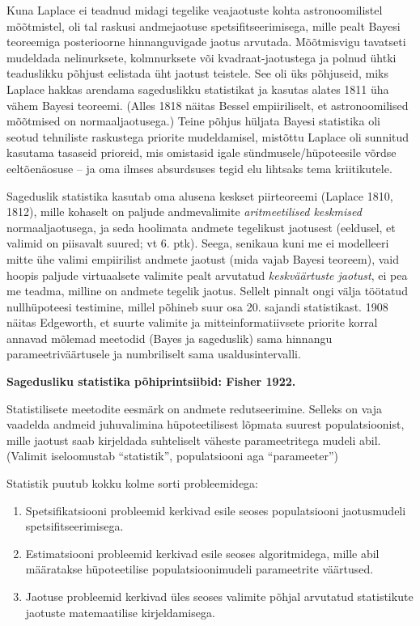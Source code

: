 \documentclass[]{book}
\begin{document}
Kuna Laplace ei teadnud midagi tegelike veajaotuste kohta astronoomilistel mõõtmistel, oli tal raskusi andmejaotuse spetsifitseerimisega, mille pealt Bayesi teoreemiga posterioorne hinnanguvigade jaotus arvutada. Mõõtmisvigu tavatseti mudeldada nelinurksete, kolmnurksete või kvadraat-jaotustega ja polnud ühtki teaduslikku põhjust eelistada üht jaotust teistele. See oli üks põhjuseid, miks Laplace hakkas arendama sageduslikku statistikat ja kasutas alates 1811 üha vähem Bayesi teoreemi. (Alles 1818 näitas Bessel empiiriliselt, et astronoomilised mõõtmised on normaaljaotusega.) Teine põhjus hüljata Bayesi statistika oli seotud tehniliste raskustega priorite mudeldamisel, mistõttu Laplace oli sunnitud kasutama tasaseid prioreid, mis omistasid igale sündmusele/hüpoteesile võrdse eeltõenäosuse -- ja oma ilmses absurdsuses tegid elu lihtsaks tema kriitikutele.

Sageduslik statistika kasutab oma alusena keskset piirteoreemi (Laplace 1810, 1812), mille kohaselt on paljude andmevalimite \emph{aritmeetilised keskmised} normaaljaotusega, ja seda hoolimata andmete tegelikust jaotusest (eeldusel, et valimid on piisavalt suured; vt 6. ptk). Seega, senikaua kuni me ei modelleeri mitte ühe valimi empiirilist andmete jaotust (mida vajab Bayesi teoreem), vaid hoopis paljude virtuaalsete valimite pealt arvutatud \emph{keskväärtuste jaotust}, ei pea me teadma, milline on andmete tegelik jaotus. Sellelt pinnalt ongi välja töötatud nullhüpoteesi testimine, millel põhineb suur osa 20. sajandi statistikast.
1908 näitas Edgeworth, et suurte valimite ja mitteinformatiivsete priorite korral annavad mõlemad meetodid (Bayes ja sageduslik) sama hinnangu parameetriväärtusele ja numbriliselt sama usaldusintervalli.

\textbf{Sagedusliku statistika põhiprintsiibid: Fisher 1922.}

Statistilisete meetodite eesmärk on andmete redutseerimine. Selleks on vaja vaadelda andmeid juhuvalimina hüpoteetilisest lõpmata suurest populatsioonist, mille jaotust saab kirjeldada suhteliselt väheste parameetritega mudeli abil. (Valimit iseloomustab ``statistik'', populatsiooni aga ``parameeter'')

Statistik puutub kokku kolme sorti probleemidega:

\begin{enumerate}
\def\labelenumi{\arabic{enumi}.}
\item
  Spetsifikatsiooni probleemid kerkivad esile seoses populatsiooni jaotusmudeli spetsifitseerimisega.
\item
  Estimatsiooni probleemid kerkivad esile seoses algoritmidega, mille abil määratakse hüpoteetilise populatsioonimudeli parameetrite väärtused.
\item
  Jaotuse probleemid kerkivad üles seoses valimite põhjal arvutatud statistikute jaotuste matemaatilise kirjeldamisega.
\end{enumerate}
\end{document}
